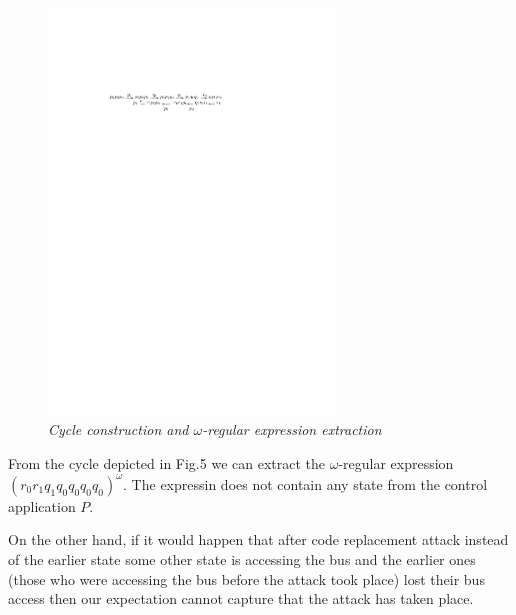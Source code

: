 \begin{figure}[h]
\begin{center}
\includegraphics[width=3.0in]{state_chage_many.pdf}
\end{center}
\vspace{-0.1in}
\caption{{\em Cycle construction and $\omega$-regular expression extraction}}
\label{fig:automaton}
\end{figure}
From the cycle depicted in Fig.5 we can extract the $\omega$-regular expression 
$(r_0r_1q_1q_0q_0q_0q_0)^\omega$. The expressin does not contain any state from
the control application $P$. 

On the other hand, if it would happen 
that after code replacement attack instead of the earlier state some other state is accessing
the bus and the earlier ones (those who were accessing the bus before the attack took place)
lost their bus access then our expectation cannot capture that the attack has taken place.

